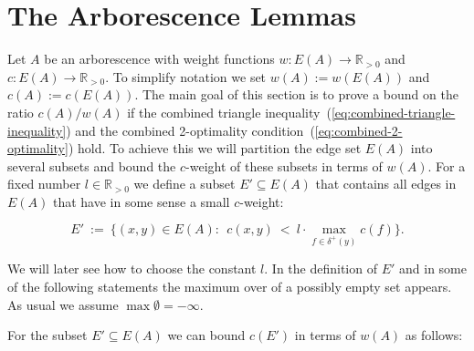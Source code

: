 \documentclass[a4paper, 11pt]{article}
\begin{document}
\section{The Arborescence Lemmas}
\label{sec:arborescence-lemmas}



Let $A$ be an arborescence with weight functions $w:E(A) \to \mathbb{R}_{>0}$
and $c:E(A) \to \mathbb{R}_{>0}$. To simplify notation we set $w(A) := w(E(A))$ and $c(A) := c(E(A))$.
The main goal of this section is to prove a bound on the ratio $c(A)/w(A)$ if  
the combined triangle inequality~(\ref{eq:combined-triangle-inequality}) and the 
combined 2-optimality condition~(\ref{eq:combined-2-optimality}) hold.
To achieve this we will partition the edge set $E(A)$ into several subsets and bound the $c$-weight of these subsets 
in terms of $w(A)$. For a fixed number $l\in\mathbb{R}_{>0}$ we define a subset $E'\subseteq E(A)$ that contains all edges in $E(A)$ 
that have in some sense a small $c$-weight:

\begin{equation}
E' ~:=~ \{ (x,y) \in E(A):~~ c(x,y) ~<~ l \cdot \max_{f\in \delta^+(y)} c(f) \}.
\label{def:E'}
\end{equation}

We will later see how to choose the constant $l$. In the definition of $E'$ and in some of the following statements 
the maximum over of a possibly empty set appears. As usual we assume $\max \emptyset = -\infty$.

For the subset $E'\subseteq E(A)$ we can bound $c(E')$ in terms of $w(A)$ as follows:
\end{document}
